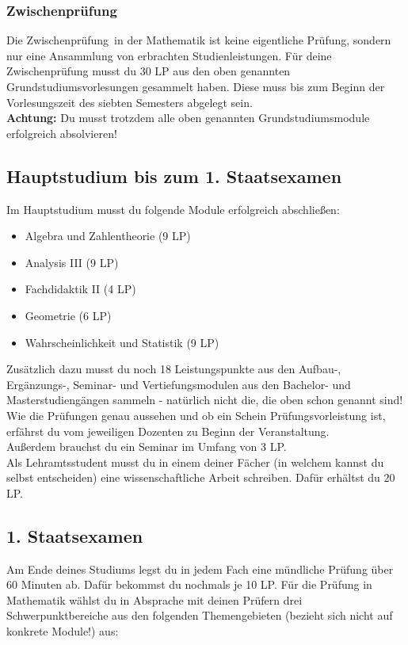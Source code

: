 \subsubsection{Zwischenprüfung}

Die \glqq Zwischenprüfung\grqq~in der Mathematik
ist keine eigentliche Prüfung, 
sondern nur eine Ansammlung von erbrachten Studienleistungen.
Für deine Zwischenprüfung musst du 30 LP
aus den oben genannten Grundstudiumsvorlesungen gesammelt haben.
Diese muss bis zum Beginn der Vorlesungszeit
des siebten Semesters abgelegt sein.\\
\textbf{Achtung:}
Du musst trotzdem alle oben genannten
Grundstudiumsmodule erfolgreich absolvieren!



\subsection{Hauptstudium bis zum 1. Staatsexamen}

Im Hauptstudium musst du folgende Module erfolgreich abschließen:
\begin{itemize}
 \item Algebra und Zahlentheorie (9 LP)
 \item Analysis III (9 LP)
 \item Fachdidaktik II (4 LP)
 \item Geometrie (6 LP)
 \item Wahrscheinlichkeit und Statistik (9 LP)
\end{itemize}

Zusätzlich dazu musst du noch 18 Leistungspunkte
aus den Aufbau-, Ergänzungs-, Seminar- und Vertiefungsmodulen
aus den Bachelor- und Masterstudiengängen sammeln
- natürlich nicht die, die oben schon genannt sind!
Wie die Prüfungen genau aussehen
und ob ein Schein Prüfungsvorleistung ist,
erfährst du vom jeweiligen Dozenten zu Beginn der Veranstaltung. \\
Außerdem brauchst du ein Seminar im Umfang von 3 LP.\\ 
Als Lehramtsstudent musst du in einem deiner Fächer
(in welchem kannst du selbst entscheiden)
eine wissenschaftliche Arbeit schreiben.
Dafür erhältst du 20 LP. 

\subsection{1. Staatsexamen}

Am Ende deines Studiums legst du in jedem Fach
eine mündliche Prüfung über 60 Minuten ab.
Dafür bekommst du nochmals je 10 LP.
Für die Prüfung in Mathematik wählst du in Absprache
mit deinen Prüfern drei Schwerpunktbereiche
aus den folgenden Themengebieten (bezieht sich nicht auf konkrete Module!) aus:

